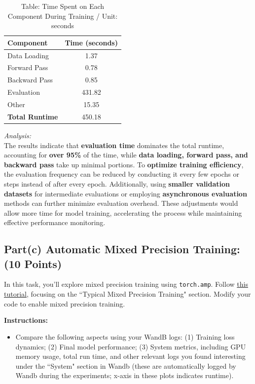 \documentclass[11pt, oneside]{article}   	%
\begin{document}
\begin{table}[ht]
    \centering
    \begin{tabular}{|l|c|}
    \hline
    \textbf{Component}      & \textbf{Time (seconds)} \\ \hline
    Data Loading            & 1.37                    \\ \hline
    Forward Pass            & 0.78                    \\ \hline
    Backward Pass           & 0.85                    \\ \hline
    Evaluation              & 431.82                  \\ \hline
    Other                   & 15.35                   \\ \hline
    \textbf{Total Runtime}  & 450.18                  \\ \hline
    \end{tabular}
    \caption{Table: Time Spent on Each Component During Training / Unit: seconds}
    \label{tab:time_components}
\end{table}

\textit{Analysis: }
\\
The results indicate that \textbf{evaluation time} dominates the total runtime, accounting for \textbf{over 95\%} of the time, while \textbf{data loading, forward pass, and backward pass} take up minimal portions. To \textbf{optimize training efficiency}, the evaluation frequency can be reduced by conducting it every few epochs or steps instead of after every epoch. Additionally, using \textbf{smaller validation datasets} for intermediate evaluations or employing \textbf{asynchronous evaluation} methods can further minimize evaluation overhead. These adjustments would allow more time for model training, accelerating the process while maintaining effective performance monitoring.

\newpage

\subsection*{Part(c) Automatic Mixed Precision Training: (10 Points)}
In this task, you'll explore mixed precision training using \texttt{torch.amp}. Follow \href{https://pytorch.org/docs/stable/notes/amp_examples.html}{this tutorial}, focusing on the ``Typical Mixed Precision Training" section. Modify your code to enable mixed precision training.

\textbf{Instructions:}
\begin{itemize}
    \item Compare the following aspects using your WandB logs: (1) Training loss dynamics; (2) Final model performance; (3) System metrics, including GPU memory usage, total run time, and other relevant logs you found interesting under the ``System" section in Wandb (these are automatically logged by Wandb during the experiments; x-axis in these plots indicates runtime).
\end{itemize}
\end{document}
